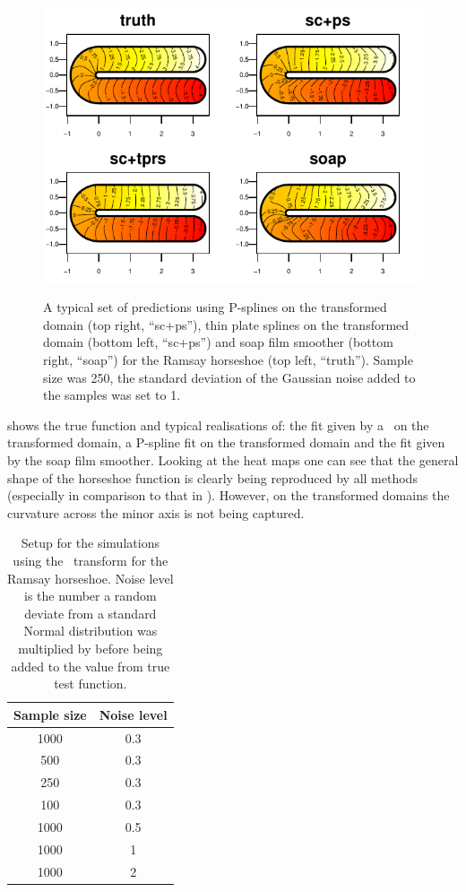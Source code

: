 \begin{figure}
\centering
\includegraphics[width=6in]{sc/figs/compsmooth.pdf} \\
\caption{A typical set of predictions using P-splines on the transformed domain (top right, ``sc+ps''), thin plate splines on the transformed domain (bottom left, ``sc+ps'') and soap film smoother (bottom right, ``soap'') for the Ramsay horseshoe (top left, ``truth''). Sample size was 250, the standard deviation of the Gaussian noise added to the samples was set to 1.}
\label{compsmooth}
\end{figure}

 shows the true function and typical realisations of: the fit given by a \tprs\ on the transformed domain, a P-spline fit on the transformed domain and the fit given by the soap film smoother. Looking at the heat maps one can see that the general shape of the horseshoe function is clearly being reproduced by all methods (especially in comparison to that in ). However, on the transformed domains the curvature across the minor axis is not being captured.

\begin{table}[tb]
\centering
\begin{tabular}{c c}\\
Sample size & Noise level \\
\hline
\hline
1000 & 0.3 \\
500 & 0.3 \\
250 & 0.3 \\
100 & 0.3 \\
1000 & 0.5 \\
1000 & 1 \\
1000 & 2 \\
\end{tabular}
\caption{Setup for the simulations using the \sch\ transform for the Ramsay horseshoe. Noise level is the number a random deviate from a standard Normal distribution was multiplied by before being added to the value from true test function.}
\label{scramsimtable}
\end{table}

